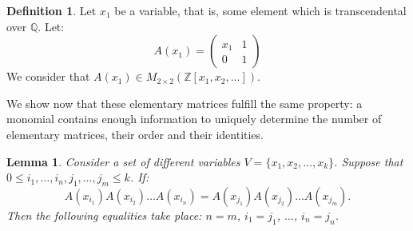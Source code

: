 \documentclass{article}
\theoremstyle{plain}
\newtheorem{lemma}{Lemma}[section]
\theoremstyle{definition}
\newtheorem{definition}{Definition}[section]
\begin{document}
\begin{definition}\label{defmatrixvar}
    Let $x_1$ be a variable, that is, some element which is transcendental over $\mathbb Q$. Let:
    $$A(x_1) = \begin{pmatrix}
        x_1 & 1 \\ 0 & 1
    \end{pmatrix}$$
    We consider that $A(x_1) \in M_{2 \times 2}(\mathbb Z[x_1, x_2, \dots])$. 
\end{definition} 

We show now that these elementary matrices fulfill the same property: a monomial contains enough information to uniquely determine the number of elementary matrices, their order and their identities.

\begin{lemma}\label{lemmamatrix}
    Consider a set of different variables $V = \{x_1, x_2, \dots, x_k\}$. Suppose that $0 \leq i_1, \dots, i_n, j_1, \dots, j_m \leq k$. If:
    $$A(x_{i_1}) A(x_{i_2}) \dots A(x_{i_n}) = A(x_{j_1}) A(x_{j_2}) \dots A(x_{j_m}).$$
    Then the following equalities take place: $n = m$, $i_1 = j_1$, $\dots$, $i_n = j_n$.
\end{lemma}
\end{document}
